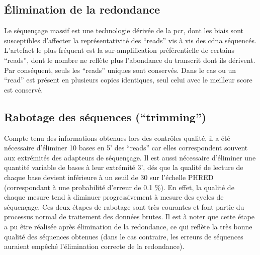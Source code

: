 \documentclass[../main.tex]{subfiles}
\begin{document}
	\subsection{Élimination de la redondance}
		Le séquençage massif est une technologie dérivée de la \gls{pcr}, dont les biais sont susceptibles d'affecter la représentativité des ``reads'' vis à vis des \gls{cdna} séquencés.
		L'artefact le plus fréquent est la sur-amplification préférentielle de certains ``reads'', dont le nombre ne reflète plus l'abondance du transcrit dont ils dérivent.
		Par conséquent, seuls les ``reads'' uniques sont conservés.
		Dans le cas ou un ``read'' est présent en plusieurs copies identiques, seul celui avec le meilleur score est conservé.

	\subsection{Rabotage des séquences (``trimming'')}
		Compte tenu des informations obtenues lors des contrôles qualité, il a été nécessaire d'éliminer 10 bases en 5’ des ``reads'' car elles correspondent souvent aux extrémités des adapteurs de séquençage.
		Il est aussi nécessaire d'éliminer une quantité variable de bases à leur extrémité 3', dés que la qualité de lecture de chaque base devient inférieure à un seuil de 30 sur l'échelle PHRED (correspondant à une probabilité d'erreur de 0.1 \%).
		En effet, la qualité de chaque mesure tend à diminuer progressivement à mesure des cycles de séquençage.
		Ces deux étapes de rabotage sont très courantes et font partie du processus normal de traitement des données brutes.
		Il est à noter que cette étape a pu être réalisée après élimination de la redondance, ce qui reflète la très bonne qualité des séquences obtenues (dans le cas contraire, les erreurs de séquences auraient empêché l'élimination correcte de la redondance).
\end{document}
